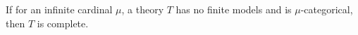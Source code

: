 If for an infinite cardinal $\mu$, a theory $T$ has no finite models and is $\mu$-categorical, then $T$ is complete.
